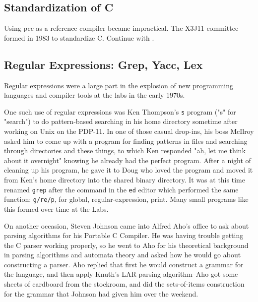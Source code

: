 \subsection{Standardization of C}

Using pcc as a reference compiler became impractical.
The X3J11 committee formed in 1983 to standardize C.
Continue with .

\subsection{Regular Expressions: Grep, Yacc, Lex}
\label{sec:software-unix-regex}

Regular expressions were a large part in the explosion of new programming languages
and compiler tools at the labs in the early 1970s.

One such use of regular expressions was Ken Thompson's \texttt{s}
program ("s" for "search") to do pattern-based searching
in his home directory sometime after working on Unix on the PDP-11.
In one of those casual drop-ins, his boss McIlroy asked him to come up with a program for finding
patterns in files and searching through directories and these things, to which Ken responded
"ah, let me think about it overnight" knowing he already had the perfect program.
After a night of cleaning up his program, he gave it to Doug who loved the program
and moved it from Ken's home directory into the shared binary directory.
It was at this time renamed \texttt{grep} after the command in the \texttt{ed} editor
which performed the same function: \texttt{g/re/p}, for global, regular-expression, print.
Many small programs like this formed over time at the Labs.

On another occasion, Steven Johnson came into Alfred Aho's office to ask about
parsing algorithms for his Portable C Compiler. He was having trouble getting the C parser
working properly, so he went to Aho for his theoretical background in parsing algorithms
and automata theory and asked how he would go about constructing a parser.
Aho replied that first he would construct a grammar for the language, and then apply
Knuth's LAR parsing algorithm--Aho got some sheets of cardboard from the stockroom,
and did the sets-of-items construction for the grammar that Johnson had given him
over the weekend.

